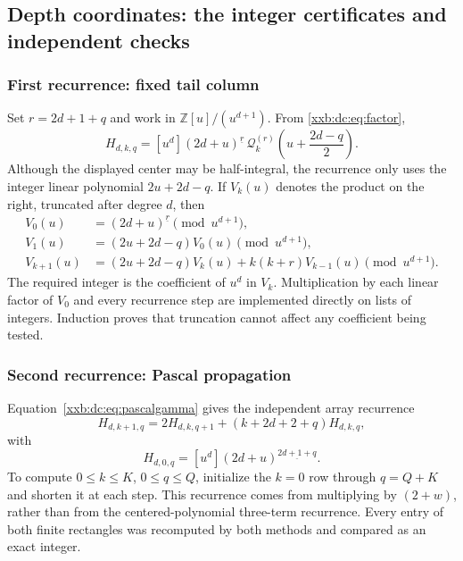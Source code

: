 \documentclass[11pt,a4paper]{article}
\numberwithin{equation}{section}
\theoremstyle{definition}
\theoremstyle{remark}
\theoremstyle{plain}
\newcommand{\Z}{\mathbb Z}
\newcommand{\fall}[2]{#1^{\underline{#2}}}
\begin{document}
\subsection{Depth coordinates: the integer certificates and independent checks}\label{xxb:dc:sec:certificates}

\subsubsection{First recurrence: fixed tail column}
Set $r=2d+1+q$ and work in $\Z[u]/(u^{d+1})$.  From
\eqref{xxb:dc:eq:factor},
\begin{equation}\label{xxb:dc:eq:Hjet}
 H_{d,k,q}=[u^d]\fall{(2d+u)}{r}\,
 \mathcal Q_k^{(r)}\!\left(u+\frac{2d-q}{2}\right).
\end{equation}
Although the displayed center may be half-integral, the recurrence only
uses the integer linear polynomial $2u+2d-q$.  If $V_k(u)$ denotes the
product on the right, truncated after degree $d$, then
\begin{equation}\label{xxb:dc:eq:Vrec}
 \begin{split}
 V_0(u)&=\fall{(2d+u)}{r}\pmod{u^{d+1}},\\
 V_1(u)&=(2u+2d-q)V_0(u)\pmod{u^{d+1}},\\
 V_{k+1}(u)&=(2u+2d-q)V_k(u)+k(k+r)V_{k-1}(u)
                 \pmod{u^{d+1}}.
 \end{split}
\end{equation}
The required integer is the coefficient of $u^d$ in $V_k$.
Multiplication by each linear factor of $V_0$ and every recurrence step
are implemented directly on lists of integers.  Induction proves that
truncation cannot affect any coefficient being tested.

\subsubsection{Second recurrence: Pascal propagation}
Equation~\eqref{xxb:dc:eq:pascalgamma} gives the independent array recurrence
\begin{equation}\label{xxb:dc:eq:Hpascal}
 H_{d,k+1,q}=2H_{d,k,q+1}+(k+2d+2+q)H_{d,k,q},
\end{equation}
with
\[
 H_{d,0,q}=[u^d]\fall{(2d+u)}{2d+1+q}.
\]
To compute $0\le k\le K$, $0\le q\le Q$, initialize the $k=0$ row
through $q=Q+K$ and shorten it at each step.  This recurrence comes from
multiplying by $(2+w)$, rather than from the centered-polynomial
three-term recurrence.  Every entry of both finite rectangles was
recomputed by both methods and compared as an exact integer.
\end{document}
